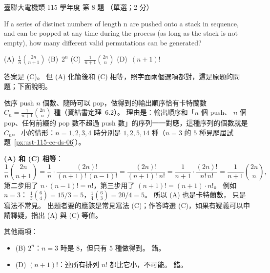 \begin{pastexam}[label={px:ust-115-ee-ds-08}]{臺聯大電機類 115 學年度 第 8 題}
（單選；2 分）

If a series of distinct numbers of length n are pushed onto a stack in sequence, and can be popped
at any time during the process (as long as the stack is not empty), how many different valid
permutations can be generated?

(A)~$\frac{1}{n}\binom{2n}{n+1}$ \qquad (B)~$2^n$ \qquad (C)~$\frac{1}{n+1}\binom{2n}{n}$
\qquad (D)~$(n+1)!$
\end{pastexam}

\begin{pastsoln}
答案是 (C)。 但 (A) 化簡後和 (C) 相等，照字面兩個選項都對，這是原題的問題；下面說明。

依序 push $n$ 個數、隨時可以 pop，做得到的輸出順序恰有卡特蘭數
$C_n = \frac{1}{n+1}\binom{2n}{n}$ 種（資結書定理~6.2）。 理由是：輸出順序和「$n$ 個 push、
$n$ 個 pop、任何前綴的 pop 數不超過 push 數」的序列一一對應，這種序列的個數就是 $C_n$。
小的情形：$n = 1, 2, 3, 4$ 時分別是 $1, 2, 5, 14$ 種（$n = 3$ 的 $5$ 種見歷屆試題~\ref{px:ust-115-ee-ds-06}）。

\textbf{(A) 和 (C) 相等}：
\[
\frac{1}{n}\binom{2n}{n+1} = \frac{1}{n} \cdot \frac{(2n)!}{(n+1)!\,(n-1)!}
= \frac{(2n)!}{(n+1)!\; n!} = \frac{1}{n+1} \cdot \frac{(2n)!}{n!\, n!} = \frac{1}{n+1}\binom{2n}{n} ,
\]
第二步用了 $n \cdot (n-1)! = n!$，第三步用了 $(n+1)! = (n+1) \cdot n!$。 例如 $n = 3$：
$\frac{1}{3}\binom{6}{4} = 15/3 = 5$，$\frac{1}{4}\binom{6}{3} = 20/4 = 5$。 所以 (A) 也是卡特蘭數，
只是寫法不常見。 出題者要的應該是常見寫法 (C)；作答時選 (C)，如果有疑義可以申請釋疑，指出 (A)
與 (C) 等值。

其他兩項：
\begin{itemize}
\item (B) $2^n$：$n = 3$ 時是 $8$，但只有 $5$ 種做得到。 錯。
\item (D) $(n+1)!$：連所有排列 $n!$ 都比它小，不可能。 錯。
\end{itemize}
\end{pastsoln}
